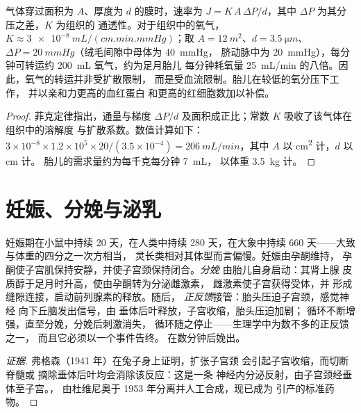 \begin{theorem}[胎盘的交换]\label{thm:b2:mammal-reproduction:fick}
气体穿过面积为 $A$、厚度为 $d$ 的膜时，速率为
$J = K\,A\,\Delta P/d$，其中 $\Delta P$ 为其分压之差，$K$ 为组织的
通透性。对于组织中的氧气，
$K \approx \qty{3e-8}{mL/(cm.min.mmHg)}$；取 $A =
\qty{12}{m^2}$、$d = \qty{3.5}{\micro m}$、$\Delta P =
\qty{20}{mmHg}$（绒毛间隙中母体为 \qty{40}{mmHg}，
脐动脉中为 \qty{20}{mmHg}），每分钟可转运约
\qty{200}{mL} 氧气，约为足月胎儿
每分钟耗氧量 \qty{25}{mL/min} 的八倍。因此，氧气的转运并非受扩散限制，
而是受血流限制。胎儿在较低的氧分压下工作，
并以亲和力更高的血红蛋白
和更高的红细胞数加以补偿。
\end{theorem}
\begin{proof}
菲克定律指出，通量与梯度
$\Delta P/d$ 及面积成正比；常数 $K$ 吸收了该气体在组织中的溶解度
与扩散系数。数值计算如下：
$3\times 10^{-8}\times 1.2\times 10^{5}\times 20/(3.5\times 10^{-4})
= \qty{206}{mL/min}$，其中 $A$ 以 \unit{cm^2} 计，$d$ 以 \unit{cm} 计。
胎儿的需求量约为每千克每分钟 \qty{7}{mL}，
以体重 \qty{3.5}{kg} 计。
\end{proof}

\section{妊娠、分娩与泌乳}

\begin{proposition}[妊娠与分娩]\label{prop:b2:mammal-reproduction:birth}
妊娠期在小鼠中持续 \num{20} 天，在人类中持续 \num{280} 天，在大象中持续 \num{660}
天——大致与体重的四分之一次方相当，
灵长类相对其体型而言偏慢。妊娠由孕酮维持，
孕酮使子宫肌保持安静，并使子宫颈保持闭合。\emph{分娩}
由胎儿自身启动：其肾上腺
皮质醇于足月时升高，使由孕酮转为分泌雌激素，
雌激素使子宫获得受体，并
形成缝隙连接，启动前列腺素的释放。随后，
\emph{正反馈}接管：胎头压迫子宫颈，感觉神经
向下丘脑发出信号，\emph{}由
垂体后叶释放，子宫收缩，胎头压迫加剧；
循环不断增强，直至分娩，分娩后刺激消失，
循环随之停止——生理学中为数不多的正反馈之一，
而且它必须以一个事件告终。
在数分钟后娩出。
\end{proposition}
\begin{proof}[证据]
弗格森（1941 年）在兔子身上证明，扩张子宫颈
会引起子宫收缩，而切断脊髓或
摘除垂体后叶均会消除该反应：这是一条
神经内分泌反射，由子宫颈经垂体至子宫。，
由杜维尼奥于 1953 年分离并人工合成，现已成为
引产的标准药物。
\end{proof}

